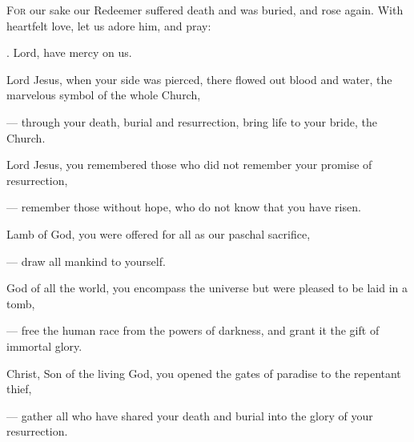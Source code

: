 \lettrine[loversize=0.15,lines=2]{F}{or} our sake our Redeemer suffered death and was buried, and rose again. With heartfelt love, let us adore him, and pray: 

\Rbar. Lord, have mercy on us.

\vspace{3pt}

\begin{hangparas}{15pt}{1}

Lord Jesus, when your side was pierced, there flowed out blood and water, the marvelous symbol of the whole Church,\par
— through your death, burial and resurrection, bring life to your bride, the Church.

\vspace{3pt}

Lord Jesus, you remembered those who did not remember your promise of resurrection,\par
— remember those without hope, who do not know that you have risen.

\vspace{3pt}

Lamb of God, you were offered for all as our paschal sacrifice,\par
— draw all mankind to yourself.

\vspace{3pt}


God of all the world, you encompass the universe but were pleased to be laid in a tomb,\par
— free the human race from the powers of darkness, and grant it the gift of immortal glory.

\vspace{3pt}

Christ, Son of the living God, you opened the gates of paradise to the repentant thief,\par
— gather all who have shared your death and burial into the glory of your resurrection.

\end{hangparas}